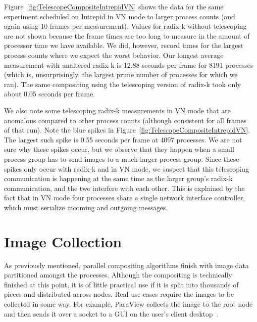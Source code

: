\documentclass{sig-alternate}
\newcommand*{\lcite}[1]{~\cite{#1}}
\begin{document}
Figure~\ref{fig:TelescopeCompositeIntrepidVN} shows the data for the same
experiment scheduled on Intrepid in VN mode to larger process counts (and
again using 10 frames per measurement).  Values for radix-k without
telescoping are not shown because the frame times are too long to measure
in the amount of processor time we have available.  We did, however, record
times for the largest process counts where we expect the worst behavior.
Our longest average measurement with unaltered radix-k is 12.88 seconds per
frame for 8191 processes (which is, unsurprisingly, the largest prime
number of processes for which we ran).  The same compositing using the
telescoping version of radix-k took only about 0.05 seconds per frame.

We also note some telescoping radix-k measurements in VN mode that are
anomalous compared to other process counts (although consistent for all
frames of that run).  Note the blue spikes in
Figure~\ref{fig:TelescopeCompositeIntrepidVN}.  The largest such spike is
0.55 seconds per frame at 4097 processes.  We are not sure why these spikes
occur, but we observe that they happen when a small process group has to
send images to a much larger process group.  Since these spikes only occur
with radix-k and in VN mode, we suspect that this telescoping communication
is happening at the same time as the larger group's radix-k communication,
and the two interfere with each other.  This is explained by the fact that
in VN mode four processes share a single network interface controller,
which must serialize incoming and outgoing messages.

\section{Image Collection}
\label{sec:ImageCollection}

As previously mentioned, parallel compositing algorithms finish with image
data partitioned amongst the processes.  Although the compositing is
technically finished at this point, it is of little practical use if it is
split into thousands of pieces and distributed across nodes.  Real use
cases require the images to be collected in some way.  For example,
ParaView collects the image to the root node and then sends it over a
socket to a GUI on the user's client desktop\lcite{Cedilnik2006}.
\end{document}
